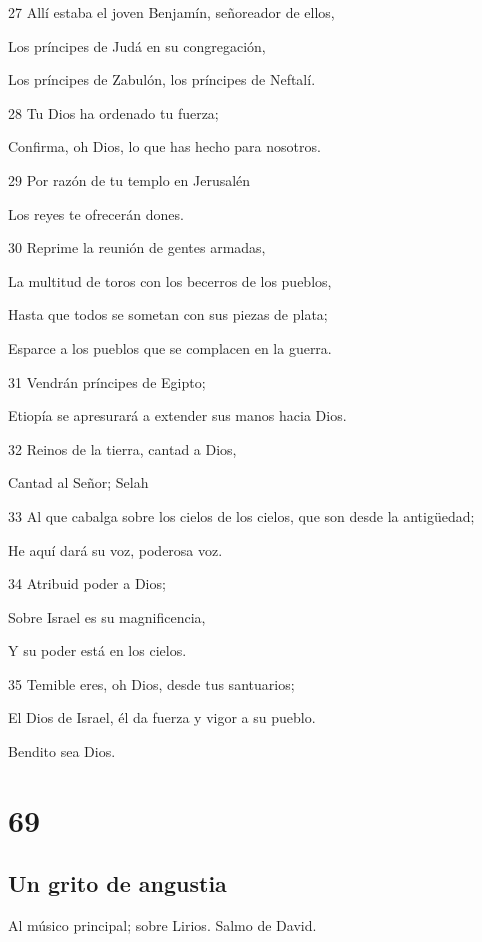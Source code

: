 \par 27 Allí estaba el joven Benjamín, señoreador de ellos,
\par Los príncipes de Judá en su congregación,
\par Los príncipes de Zabulón, los príncipes de Neftalí.
\par 28 Tu Dios ha ordenado tu fuerza;
\par Confirma, oh Dios, lo que has hecho para nosotros.
\par 29 Por razón de tu templo en Jerusalén
\par Los reyes te ofrecerán dones.
\par 30 Reprime la reunión de gentes armadas,
\par La multitud de toros con los becerros de los pueblos,
\par Hasta que todos se sometan con sus piezas de plata;
\par Esparce a los pueblos que se complacen en la guerra.
\par 31 Vendrán príncipes de Egipto;
\par Etiopía se apresurará a extender sus manos hacia Dios.
\par 32 Reinos de la tierra, cantad a Dios,
\par Cantad al Señor; Selah
\par 33 Al que cabalga sobre los cielos de los cielos, que son desde la antigüedad;
\par He aquí dará su voz, poderosa voz.
\par 34 Atribuid poder a Dios;
\par Sobre Israel es su magnificencia,
\par Y su poder está en los cielos.
\par 35 Temible eres, oh Dios, desde tus santuarios;
\par El Dios de Israel, él da fuerza y vigor a su pueblo.
\par Bendito sea Dios.

\chapter{69}

\section*{Un grito de angustia}

\par Al músico principal; sobre Lirios. Salmo de David.

